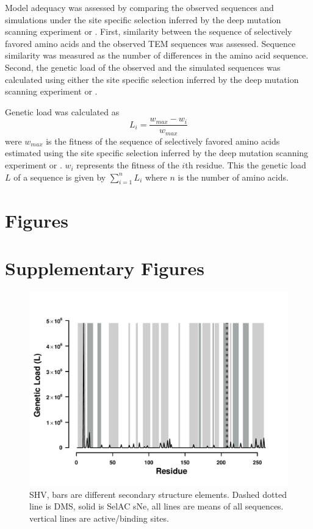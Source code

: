 \documentclass[12pt]{article}
\begin{document}
Model adequacy was assessed by comparing the observed sequences and simulations under the site specific selection inferred by the deep mutation scanning experiment or \selac.
First, similarity between the sequence of selectively favored amino acids and the observed TEM sequences was assessed.
Sequence similarity was measured as the number of differences in the amino acid sequence.
Second, the genetic load of the observed and the simulated sequences was calculated using either the site specific selection inferred by the deep mutation scanning experiment or \selac.

Genetic load was calculated as
\begin{equation}
L_i = \frac{w_{max} - w_i}{w_{max}}
\end{equation}
were $w_{max}$ is the fitness of the sequence of selectively favored amino acids estimated using  the site specific selection inferred by the deep mutation scanning experiment or \selac.
$w_i$ represents the fitness of the $i$th residue.
This the genetic load $L$ of a sequence is given by $\sum_{i=1}^n L_i$ where $n$ is the number of amino acids.






\section*{Figures}



\beginsupplement
\section*{Supplementary Figures}


\begin{figure}[H]
     \centering
	\includegraphics[width=\textwidth]{img/GL_slide_SHV2016}
	\caption{SHV, bars are different secondary structure elements. Dashed dotted line is DMS, solid is SelAC sNe, all lines are means of all sequences. vertical lines are active/binding sites.}
	\label{fig:shv2016_sse}
\end{figure}
\end{document}
